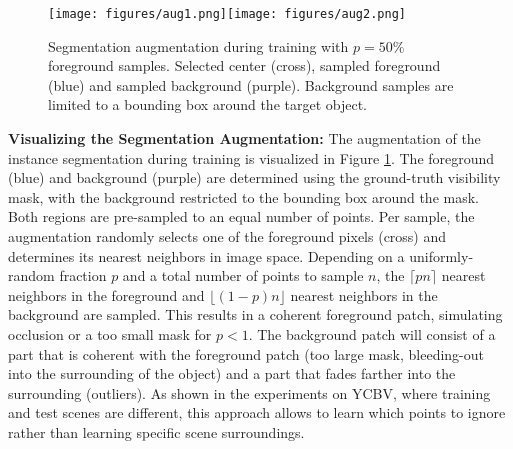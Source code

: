 \documentclass[10pt,twocolumn,letterpaper]{article}
\begin{document}
\begin{figure}
    \centering
    \texttt{[image: figures/aug1.png]}\texttt{[image: figures/aug2.png]}
    \caption{Segmentation augmentation during training with $p=50\%$ foreground samples. Selected center (cross), sampled foreground (blue) and sampled background (purple). Background samples are limited to a bounding box around the target object.}
    \label{fig:segmentation}
\end{figure}

\textbf{Visualizing the Segmentation Augmentation: }The augmentation of the instance segmentation during training is visualized in Figure \ref{fig:segmentation}. The foreground (blue) and background (purple) are determined using the ground-truth visibility mask, with the background restricted to the bounding box around the mask. Both regions are pre-sampled to an equal number of points. Per sample, the augmentation randomly selects one of the foreground pixels (cross) and determines its nearest neighbors in image space. Depending on a uniformly-random fraction $p$ and a total number of points to sample $n$, the $\lceil pn \rceil$ nearest neighbors in the foreground and $\lfloor (1-p)n \rfloor$ nearest neighbors in the background are sampled. This results in a coherent foreground patch, simulating occlusion or a too small mask for $p<1$. The background patch will consist of a part that is coherent with the foreground patch (too large mask, bleeding-out into the surrounding of the object) and a part that fades farther into the surrounding (outliers). As shown in the experiments on YCBV, where training and test scenes are different, this approach allows to learn which points to ignore rather than learning specific scene surroundings.
\end{document}
